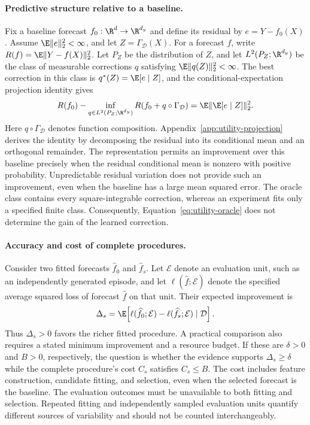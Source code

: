 \paragraph{Predictive structure relative to a baseline.}
Fix a baseline forecast $f_0:\R^d\to\R^{d_y}$ and define its residual by
$e=Y-f_0(X)$. Assume $\E\|e\|_2^2<\infty$, and let
$Z=\Gamma_{\mathcal D}(X)$. For a forecast $f$, write
$R(f)=\E\|Y-f(X)\|_2^2$. Let $P_Z$ be the distribution of $Z$, and let
$L^2(P_Z;\R^{d_y})$ be the class of measurable corrections $q$ satisfying
$\E\|q(Z)\|_2^2<\infty$. The best correction in this class is
$q^*(Z)=\E[e\mid Z]$, and the conditional-expectation projection identity gives
\begin{equation}\label{eq:utility-oracle}
 R(f_0)-\inf_{q\in L^2(P_Z;\R^{d_y})}
 R(f_0+q\circ\Gamma_{\mathcal D})
 =\E\|\E[e\mid Z]\|_2^2.
\end{equation}
Here $q\circ\Gamma_{\mathcal D}$ denotes function composition.
Appendix~\ref{app:utility-projection} derives the identity by decomposing the
residual into its conditional mean and an orthogonal remainder. The
representation permits an improvement over this baseline precisely when
the residual conditional mean is nonzero with positive probability.
Unpredictable residual variation does not provide such an improvement,
even when the baseline has a large mean squared error. The oracle class
contains every square-integrable correction, whereas an experiment fits
only a specified finite class. Consequently, Equation~\eqref{eq:utility-oracle}
does not determine the gain of the learned correction.

\paragraph{Accuracy and cost of complete procedures.}
Consider two fitted forecasts $\widehat f_0$ and $\widehat f_s$. Let
$\mathcal E$ denote an evaluation unit, such as an independently generated
episode, and let $\ell(\widehat f;\mathcal E)$ denote the specified average
squared loss of forecast $\widehat f$ on that unit. Their expected improvement is
\begin{equation}\label{eq:utility-delta}
 \Delta_s=\E\!\left[
 \ell(\widehat f_0;\mathcal E)-\ell(\widehat f_s;\mathcal E)
 \mid\mathcal D\right].
\end{equation}
Thus $\Delta_s>0$ favors the richer fitted procedure. A practical comparison
also requires a stated minimum improvement and a resource budget. If these
are $\delta>0$ and $B>0$, respectively, the question is whether the evidence
supports $\Delta_s\geq\delta$ while the complete procedure's cost $C_s$
satisfies $C_s\leq B$. The cost includes feature construction, candidate
fitting, and selection, even when the selected forecast is the baseline.
The evaluation outcomes must be unavailable to both fitting and selection.
Repeated fitting and independently sampled evaluation units quantify
different sources of variability and should not be counted interchangeably.

